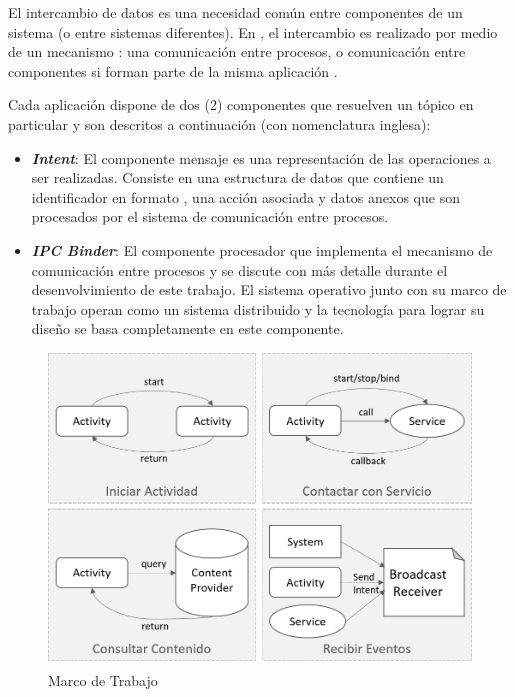 El intercambio de datos es una necesidad común entre componentes de
un sistema (o entre sistemas diferentes). En , el intercambio
es realizado por medio de un mecanismo : una comunicación
entre procesos, o comunicación entre componentes si forman parte de
la misma aplicación \cite{Schreiber2011}. 

Cada aplicación dispone de dos (2) componentes que resuelven un tópico
en particular y son descritos a continuación (con nomenclatura inglesa):
\begin{itemize}
\item \textbf{\emph{Intent}}: El componente mensaje es una representación
de las operaciones a ser realizadas. Consiste en una estructura de
datos que contiene un identificador en formato , una acción
asociada y datos anexos que son procesados por el sistema de comunicación
entre procesos. 
\item \textbf{\emph{IPC Binder}}: El componente procesador que implementa
el mecanismo de comunicación entre procesos \emph{\cite{Schreiber2011}}
y se discute con más detalle durante el desenvolvimiento de este trabajo\emph{.
}El sistema operativo  junto con su marco de trabajo
operan como un sistema distribuido y la tecnología para lograr su
diseño se basa completamente en este componente.
\end{itemize}
\begin{figure}[H]
\begin{centering}
\includegraphics[width=1\columnwidth]{capitulo-5/graphics/mensajes_ipc}
\par\end{centering}
\caption[\emph{Framework Android}]{\label{fig5:mensajes-ipc}Marco de Trabajo }
\end{figure}


